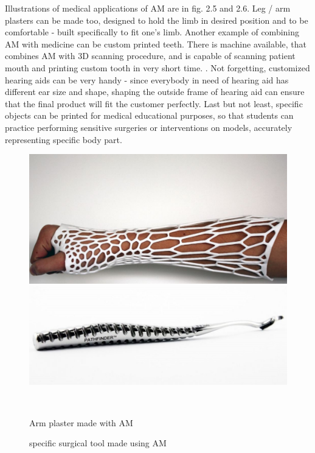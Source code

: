 \documentclass[a4paper, twoside, 11pt]{report}
\begin{document}
	Illustrations of medical applications of AM are in fig. 2.5 and 2.6. Leg / arm plasters can be made too, designed to hold the limb in desired position and to be comfortable - built specifically to fit one's limb. Another example of combining AM with medicine can be custom printed teeth. There is machine available, that combines AM with 3D scanning procedure, and is capable of scanning patient mouth and printing custom tooth in very short time. \cite{DentalPrinter}. Not forgetting, customized hearing aids can be very handy - since everybody in need of hearing aid has different ear size and shape, shaping the outside frame of hearing aid can ensure that the final product will fit the customer perfectly. Last but not least, specific objects can be printed for medical educational purposes, so that students can practice performing sensitive  surgeries or interventions on models, accurately representing specific body part.
%
\begin{figure}[h]
  \centering
  \begin{minipage}[b]{0.45\textwidth}
    \includegraphics[width=\textwidth]{armPlaster}
  \end{minipage}
  \hfill
  \begin{minipage}[b]{0.45\textwidth}
    \includegraphics[width=\textwidth]{surgicalTool}
  \end{minipage}
  \\[5pt]
  \begin{minipage}[t]{0.45\textwidth}
    \caption{Arm plaster made with AM}
  \end{minipage}
  \hfill
  \begin{minipage}[t]{0.45\textwidth}
    \caption{specific surgical tool made using AM}
  \end{minipage}
\end{figure}
\end{document}
